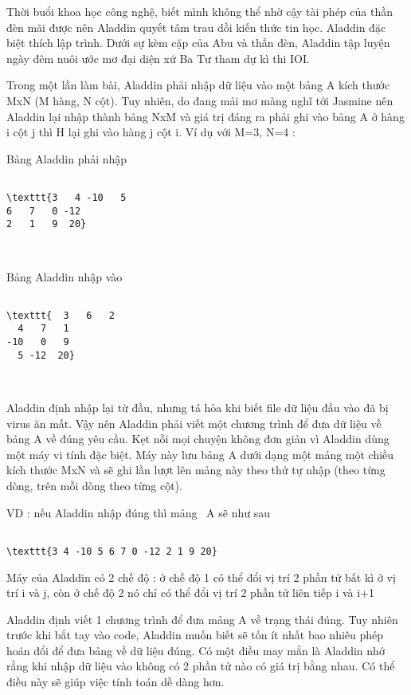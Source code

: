 

Thời buổi khoa học công nghệ, biết mình không thể nhờ cậy tài phép của thần đèn mãi được nên Aladdin quyết tâm trau dồi kiến thức tin học. Aladdin đặc biệt thích lập trình. Dưới sự kèm cặp của Abu và thần đèn, Aladdin tập luyện ngày đêm nuôi ước mơ đại diện xứ Ba Tư tham dự kì thi IOI.

Trong một lần làm bài, Aladdin phải nhập dữ liệu vào một bảng A kích thước MxN (M hàng, N cột). Tuy nhiên, do đang mải mơ màng nghĩ tới Jasmine nên Aladdin lại nhập thành bảng NxM và giá trị đáng ra phải ghi vào bảng A ở hàng i cột j thì H lại ghi vào hàng j cột i. Ví dụ với M=3, N=4 :

Bảng Aladdin phải nhập
\begin{verbatim}

\texttt{3   4 -10   5
6   7   0 -12
2   1   9  20}\end{verbatim}

 

Bảng Aladdin nhập vào
\begin{verbatim}

\texttt{  3   6   2
  4   7   1
-10   0   9
  5 -12  20}\end{verbatim}

 

Aladdin định nhập lại từ đầu, nhưng tá hỏa khi biết file dữ liệu đầu vào đã bị virus ăn mất. Vậy nên Aladdin phải viết một chương trình để đưa dữ liệu về bảng A về đúng yêu cầu. Kẹt nỗi mọi chuyện không đơn giản vì Aladdin dùng một máy vi tính đặc biệt. Máy này lưu bảng A dưới dạng một mảng một chiều kích thước MxN và sẽ ghi lần lượt lên mảng này theo thứ tự nhập (theo từng dòng, trên mỗi dòng theo từng cột).

VD : nếu Aladdin nhập đúng thì mảng  A sẽ như sau
\begin{verbatim}

\texttt{3 4 -10 5 6 7 0 -12 2 1 9 20}\end{verbatim}

Máy của Aladdin có 2 chế độ : ở chế độ 1 có thể đổi vị trí 2 phần tử bất kì ở vị trí i và j, còn ở chế độ 2 nó chỉ có thể đổi vị trí 2 phần tử liên tiếp i và i+1

Aladdin định viết 1 chương trình để đưa mảng A về trạng thái đúng. Tuy nhiên trước khi bắt tay vào code, Aladdin muốn biết sẽ tốn ít nhất bao nhiêu phép hoán đổi để đưa bảng về dữ liệu đúng. Có một điều may mắn là Aladdin nhớ rằng khi nhập dữ liệu vào không có 2 phần tử nào có giá trị bằng nhau. Có thể điều này sẽ giúp việc tính toán dễ dàng hơn.


